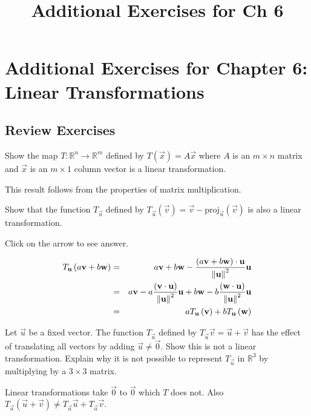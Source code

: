 \documentclass{ximera}
\title{Additional Exercises for Ch 6} \license{CC BY-NC-SA 4.0}
\begin{document}
\begin{abstract}
\end{abstract}
\maketitle

\section*{Additional Exercises for Chapter 6: Linear Transformations}

\subsection*{Review Exercises}

\begin{problem}\label{prb:6.1} Show the map $T:\mathbb{R}^{n}\rightarrow \mathbb{R}^{m}$ defined by
$T\left( \vec{x} \right) =A\vec{x}$ where $A$ is an $m\times n$ matrix
and $\vec{x}$ is an $m\times 1$ column vector is a linear transformation.
\begin{hint}
This result follows from the properties of matrix multiplication.
\end{hint}
\end{problem}

\begin{problem}\label{prb:6.2} Show that the function $T_{\vec{u}}$ defined by $T_{\vec{u}}
\left( \vec{v}\right) = \vec{v}-\mbox{proj}_{\vec{u}}\left(
\vec{v}\right) $ is also a linear transformation.

Click on the arrow to see answer.
\begin{expandable}
\begin{eqnarray*}
T_{\mathbf{u}}\left( a\mathbf{v}+b\mathbf{w}\right) &=&a\mathbf{v}+b\mathbf{w}-\frac{\left( a\mathbf{v}+b\mathbf{w}\right)\cdot \mathbf{u} }{\left\lVert \mathbf{u}
\right\rVert ^{2}}\mathbf{u} \\
&=&a\mathbf{v}-a\frac{\left( \mathbf{v}\cdot \mathbf{u}\right) }{\left\lVert \mathbf{u} \right\rVert ^{2}}\mathbf{u}+b\mathbf{w}-b\frac{\left( \mathbf{w}\cdot \mathbf{u}
\right) }{\left\lVert \mathbf{u}\right\rVert ^{2}}\mathbf{u} \\
&=&aT_{\mathbf{u}}\left( \mathbf{v}\right) +bT_{\mathbf{u}}\left( \mathbf{w}
\right)
\end{eqnarray*}
\end{expandable}
\end{problem}


\begin{problem}\label{prb:6.3} Let $\vec{u}$ be a fixed vector. The function
$T_{\vec{u}}$ defined by $T_{\vec{u}}\vec{v}=\vec{u}+\vec{v}$ has the effect of
translating all vectors by adding $\vec{u}\neq \vec{0}$. Show this is not a
linear transformation. Explain why it is not possible to represent
$T_{\vec{u}}$ in $\mathbb{R}^{3}$ by multiplying by a $3\times 3$ matrix.
\begin{hint}
Linear
transformations take $\vec{0}$ to $\vec{0}$ which $T$ does not. Also $T_{\vec{a}}\left( \vec{u}+\vec{v}\right) \neq T_{\vec{a}}\vec{u}+T_{\vec{a}}
\vec{v}.$
\end{hint}
\end{problem}
\end{document}
